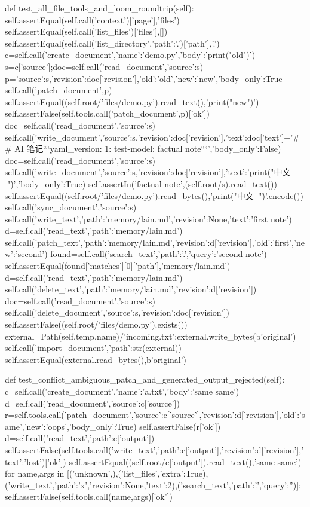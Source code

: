    def test_all_file_tools_and_loom_roundtrip(self):
        self.assertEqual(self.call('context')['page'],'files')
        self.assertEqual(self.call('list_files')['files'],[])
        self.assertEqual(self.call('list_directory',{'path':'.'})['path'],'.')
        c=self.call('create_document',{'name':'demo.py','body':'print("old")'})
        s=c['source'];doc=self.call('read_document',{'source':s})
        p={'source':s,'revision':doc['revision'],'old':'old','new':'new','body_only':True}
        self.call('patch_document',p)
        self.assertEqual((self.root/'files/demo.py').read_text(),'print("new")')
        self.assertFalse(self.tools.call('patch_document',p)['ok'])
        doc=self.call('read_document',{'source':s})
        self.call('write_document',{'source':s,'revision':doc['revision'],'text':doc['text']+'\n## AI 笔记\n```yaml\nsource_version: 1\nwriter: test-model\nsummary: factual note\n```\n','body_only':False})
        doc=self.call('read_document',{'source':s})
        self.call('write_document',{'source':s,'revision':doc['revision'],'text':'print("中文 🧸")\r\n','body_only':True})
        self.assertIn('factual note',(self.root/s).read_text())
        self.assertEqual((self.root/'files/demo.py').read_bytes(),'print("中文 🧸")\r\n'.encode())
        self.call('sync_document',{'source':s})
        self.call('write_text',{'path':'memory/lain.md','revision':None,'text':'first note'})
        d=self.call('read_text',{'path':'memory/lain.md'})
        self.call('patch_text',{'path':'memory/lain.md','revision':d['revision'],'old':'first','new':'second'})
        found=self.call('search_text',{'path':'.','query':'second note'})
        self.assertEqual(found['matches'][0]['path'],'memory/lain.md')
        d=self.call('read_text',{'path':'memory/lain.md'})
        self.call('delete_text',{'path':'memory/lain.md','revision':d['revision']})
        doc=self.call('read_document',{'source':s})
        self.call('delete_document',{'source':s,'revision':doc['revision']})
        self.assertFalse((self.root/'files/demo.py').exists())
        external=Path(self.temp.name)/'incoming.txt';external.write_bytes(b'original\n')
        self.call('import_document',{'path':str(external)})
        self.assertEqual(external.read_bytes(),b'original\n')

    def test_conflict_ambiguous_patch_and_generated_output_rejected(self):
        c=self.call('create_document',{'name':'a.txt','body':'same same'})
        d=self.call('read_document',{'source':c['source']})
        r=self.tools.call('patch_document',{'source':c['source'],'revision':d['revision'],'old':'same','new':'oops','body_only':True})
        self.assertFalse(r['ok'])
        d=self.call('read_text',{'path':c['output']})
        self.assertFalse(self.tools.call('write_text',{'path':c['output'],'revision':d['revision'],'text':'lost'})['ok'])
        self.assertEqual((self.root/c['output']).read_text(),'same same')
        for name,args in [('unknown',{}),('list_files',{'extra':True}),('write_text',{'path':'x','revision':None,'text':2}),('search_text',{'path':'.','query':''})]:
            self.assertFalse(self.tools.call(name,args)['ok'])

